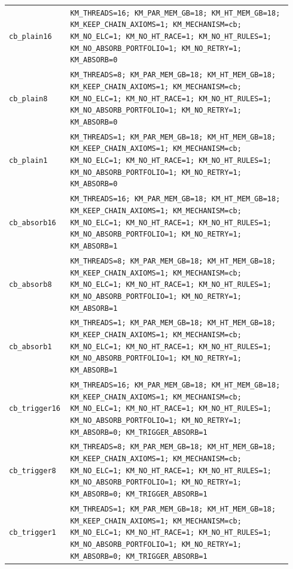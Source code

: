 \begin{longtable}{@{}p{0.18\linewidth}p{0.76\linewidth}@{}}
\texttt{cb\_plain16} & \texttt{KM\_THREADS=16; KM\_PAR\_MEM\_GB=18; KM\_HT\_MEM\_GB=18; KM\_KEEP\_CHAIN\_AXIOMS=1; KM\_MECHANISM=cb; KM\_NO\_ELC=1; KM\_NO\_HT\_RACE=1; KM\_NO\_HT\_RULES=1; KM\_NO\_ABSORB\_PORTFOLIO=1; KM\_NO\_RETRY=1; KM\_ABSORB=0} \\
\texttt{cb\_plain8} & \texttt{KM\_THREADS=8; KM\_PAR\_MEM\_GB=18; KM\_HT\_MEM\_GB=18; KM\_KEEP\_CHAIN\_AXIOMS=1; KM\_MECHANISM=cb; KM\_NO\_ELC=1; KM\_NO\_HT\_RACE=1; KM\_NO\_HT\_RULES=1; KM\_NO\_ABSORB\_PORTFOLIO=1; KM\_NO\_RETRY=1; KM\_ABSORB=0} \\
\texttt{cb\_plain1} & \texttt{KM\_THREADS=1; KM\_PAR\_MEM\_GB=18; KM\_HT\_MEM\_GB=18; KM\_KEEP\_CHAIN\_AXIOMS=1; KM\_MECHANISM=cb; KM\_NO\_ELC=1; KM\_NO\_HT\_RACE=1; KM\_NO\_HT\_RULES=1; KM\_NO\_ABSORB\_PORTFOLIO=1; KM\_NO\_RETRY=1; KM\_ABSORB=0} \\
\texttt{cb\_absorb16} & \texttt{KM\_THREADS=16; KM\_PAR\_MEM\_GB=18; KM\_HT\_MEM\_GB=18; KM\_KEEP\_CHAIN\_AXIOMS=1; KM\_MECHANISM=cb; KM\_NO\_ELC=1; KM\_NO\_HT\_RACE=1; KM\_NO\_HT\_RULES=1; KM\_NO\_ABSORB\_PORTFOLIO=1; KM\_NO\_RETRY=1; KM\_ABSORB=1} \\
\texttt{cb\_absorb8} & \texttt{KM\_THREADS=8; KM\_PAR\_MEM\_GB=18; KM\_HT\_MEM\_GB=18; KM\_KEEP\_CHAIN\_AXIOMS=1; KM\_MECHANISM=cb; KM\_NO\_ELC=1; KM\_NO\_HT\_RACE=1; KM\_NO\_HT\_RULES=1; KM\_NO\_ABSORB\_PORTFOLIO=1; KM\_NO\_RETRY=1; KM\_ABSORB=1} \\
\texttt{cb\_absorb1} & \texttt{KM\_THREADS=1; KM\_PAR\_MEM\_GB=18; KM\_HT\_MEM\_GB=18; KM\_KEEP\_CHAIN\_AXIOMS=1; KM\_MECHANISM=cb; KM\_NO\_ELC=1; KM\_NO\_HT\_RACE=1; KM\_NO\_HT\_RULES=1; KM\_NO\_ABSORB\_PORTFOLIO=1; KM\_NO\_RETRY=1; KM\_ABSORB=1} \\
\texttt{cb\_trigger16} & \texttt{KM\_THREADS=16; KM\_PAR\_MEM\_GB=18; KM\_HT\_MEM\_GB=18; KM\_KEEP\_CHAIN\_AXIOMS=1; KM\_MECHANISM=cb; KM\_NO\_ELC=1; KM\_NO\_HT\_RACE=1; KM\_NO\_HT\_RULES=1; KM\_NO\_ABSORB\_PORTFOLIO=1; KM\_NO\_RETRY=1; KM\_ABSORB=0; KM\_TRIGGER\_ABSORB=1} \\
\texttt{cb\_trigger8} & \texttt{KM\_THREADS=8; KM\_PAR\_MEM\_GB=18; KM\_HT\_MEM\_GB=18; KM\_KEEP\_CHAIN\_AXIOMS=1; KM\_MECHANISM=cb; KM\_NO\_ELC=1; KM\_NO\_HT\_RACE=1; KM\_NO\_HT\_RULES=1; KM\_NO\_ABSORB\_PORTFOLIO=1; KM\_NO\_RETRY=1; KM\_ABSORB=0; KM\_TRIGGER\_ABSORB=1} \\
\texttt{cb\_trigger1} & \texttt{KM\_THREADS=1; KM\_PAR\_MEM\_GB=18; KM\_HT\_MEM\_GB=18; KM\_KEEP\_CHAIN\_AXIOMS=1; KM\_MECHANISM=cb; KM\_NO\_ELC=1; KM\_NO\_HT\_RACE=1; KM\_NO\_HT\_RULES=1; KM\_NO\_ABSORB\_PORTFOLIO=1; KM\_NO\_RETRY=1; KM\_ABSORB=0; KM\_TRIGGER\_ABSORB=1} \\

\end{longtable}
